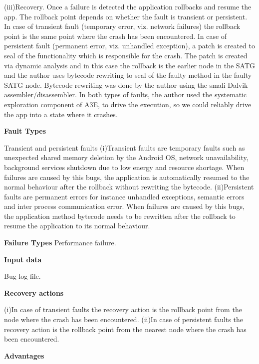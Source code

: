 \begin{compactitem}
(iii)Recovery. Once a failure is detected the application rollbacks and resume the app. The rollback point depends on whether the fault is transient or persistent. In case of transient fault (temporary error, viz. network failures) the rollback point is the same point where the crash has been encountered. In case of persistent fault (permanent error, viz. unhandled exception), a patch is created to seal of the functionality which is responsible for the crash. The patch is created via dynamic analysis and in this case the rollback is the earlier node in the SATG and the author uses bytecode rewriting to seal of the faulty method in the faulty SATG node. Bytecode rewriting was done by the author using the smali Dalvik assembler/disassembler. In both types of faults, the author used the systematic exploration component of A3E, to drive the execution, so we could reliably drive the app into a state where it crashes.

\item[\textbf{Fault Types}]

Transient and persistent faults
(i)Transient faults are temporary faults such as unexpected shared memory deletion by the Android OS, network unavailability, background services shutdown due to low energy and resource shortage. When failures are caused by this bugs, the application is automatically resumed to the normal behaviour after the rollback without rewriting the bytecode.
(ii)Persistent faults are permanent errors for instance unhandled exceptions, semantic errors and inter process communication error. When failures are caused by this bugs, the application method bytecode needs to be rewritten after the rollback to resume the application to its normal behaviour.
 
\item[\textbf{Failure Types}]
Performance failure.

\item[\textbf{Input data}] 

Bug log file.

\item[\textbf{Recovery actions}]

(i)In case of transient faults the recovery action is the rollback point from the node where the crash has been encountered.
(ii)In case of persistent faults the recovery action is the rollback point from the nearest node where the crash has been encountered.

\item[\textbf{Advantages}] 


\end{compactitem}

